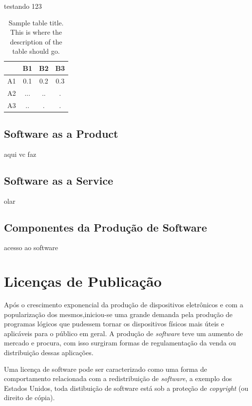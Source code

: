\documentclass{classe_cn}                 %
\begin{document}
testando 123

\begin{table}[h!]
\label{tag_tabela_01}
\caption{Sample table title. This is where the description of the table should go.}
  \begin{tabular}{cccc}
  \hline
       & B1   & B2   & B3   \\ \hline
   A1  & 0.1  & 0.2  & 0.3  \\
   A2  & ...  & ..   & .    \\
   A3  & ..   & .    & .    \\ \hline
  \end{tabular}
\end{table}

\subsection{Software as a Product}

aqui vc faz

\subsection{Software as a Service}

olar

\subsection{Componentes da Produção de Software}

acesso ao software

\section{Licenças de Publicação}

Após o crescimento exponencial da produção de dispositivos eletrônicos e com a popularização dos mesmos,iniciou-se uma grande demanda pela produção de programas lógicos que pudessem tornar os dispositivos físicos mais úteis e aplicáveis para o público em geral. A produção de \textit{software} teve um aumento de mercado e procura, com isso surgiram formas de regulamentação da venda ou distribuição dessas aplicações.

Uma licença de software pode ser caracterizado como uma forma de comportamento relacionada com a redistribuição de \textit{software}, a exemplo dos Estados Unidos, toda distibuição de software está sob a proteção de \textit{copyright} (ou direito de cópia).
\end{document}
